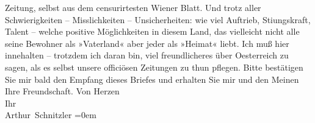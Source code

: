 \begin{ledgroupsized}[t]{13cm}
                    Zeitung, selbst aus dem censurirtesten Wiener
                    Blatt. Und trotz aller Schwierigkeiten – Misslichkeiten – Unsicherheiten: wie
                    viel Auftrieb, Sti{\geminationm}ungskraft, Talent – welche
                    positive Möglichkeiten in diesem Land, das vielleicht nicht {\pb}alle
                    seine Bewohner als »Vaterland« aber jeder als »Heimat« liebt. Ich muß hier
                    innehalten – trotzdem ich daran bin, viel freundlicheres über Oesterreich zu sagen, als es \introOben{}selbst\introOben{} unsere officiösen Zeitungen zu thun pflegen.\pend
           \pstart
           Bitte bestätigen Sie mir bald den Empfang dieses Briefes und erhalten Sie mir und
                    den Meinen Ihre Freundschaft.\pend
           \pstart
           Von Herzen{\\[\baselineskip]}Ihr{\\[\baselineskip]}\spacefill\mbox{Arthur Schnitzler}\pend
           \leftskip=0em{}\endnumbering{}\end{ledgroupsized}  \newcommand{\dateiname}{L02292}\newcommand{\titel}{Arthur Schnitzler an Georg Brandes, 2. 8. 1918}\newcommand{\editorInnen}{Martin Anton Müller und Gerd-Hermann Susen}
      